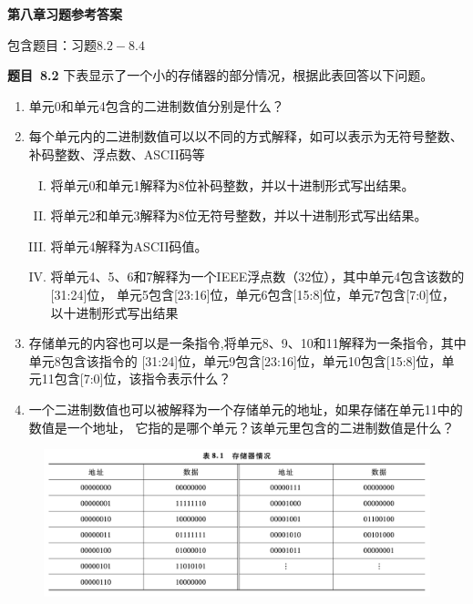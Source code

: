 \documentclass[10pt,a4paper,UTF8]{ctexart}
\newcommand{\problemname}{待定义}
\newenvironment{problem}{\begin{shaded}\par\noindent\textbf{题目\  \problemname}}{\end{shaded}\par}
\begin{document}
\begin{center}
\LARGE\textbf{第八章习题参考答案}
\end{center}

{\kaishu 包含题目：习题$8.2-8.4$}




\renewcommand{\problemname}{8.2}
\begin{problem}
	下表显示了一个小的存储器的部分情况，根据此表回答以下问题。
	\begin{enumerate}[(1)]
		\item 单元0和单元4包含的二进制数值分别是什么？
		\item 每个单元内的二进制数值可以以不同的方式解释，如可以表示为无符号整数、
		补码整数、浮点数、ASCII码等
			\begin{enumerate}[I.]
				\item 将单元0和单元1解释为8位补码整数，并以十进制形式写出结果。
				\item 将单元2和单元3解释为8位无符号整数，并以十进制形式写出结果。
				\item 将单元4解释为ASCII码值。
				\item 将单元4、5、6和7解释为一个IEEE浮点数（32位），其中单元4包含该数的[31:24]位，
				单元5包含[23:16]位，单元6包含[15:8]位，单元7包含[7:0]位，以十进制形式写出结果
			\end{enumerate}
		\item 存储单元的内容也可以是一条指令,将单元8、9、10和11解释为一条指令，其中单元8包含该指令的
		[31:24]位，单元9包含[23:16]位，单元10包含[15:8]位，单元11包含[7:0]位，该指令表示什么？
		\item 一个二进制数值也可以被解释为一个存储单元的地址，如果存储在单元11中的数值是一个地址，
		它指的是哪个单元？该单元里包含的二进制数值是什么？
	\end{enumerate}
\end{problem}

\begin{figure}[H]
	\centering
	\includegraphics[scale=0.5]{img/8.2.png}
\end{figure}
\end{document}
